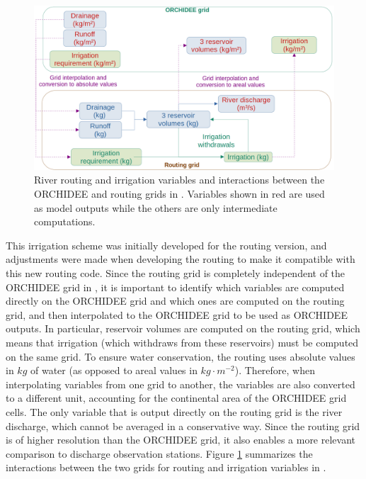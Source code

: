 \begin{figure}[htbp]
    \centering
    \includegraphics[width=\textwidth]{images/methods/routing_irrig_interpolation_outputvars.png}
    \caption{River routing and irrigation variables and interactions between the ORCHIDEE and routing grids in \native. Variables shown in red are used as model outputs while the others are only intermediate computations.}
    \label{fig:irrig_interpolations_outputvars}
\end{figure}

This irrigation scheme was initially developed for the \std routing version, and adjustments were made when developing the \native routing to make it compatible with this new routing code. Since the routing grid is completely independent of the ORCHIDEE grid in \native, it is important to identify which variables are computed directly on the ORCHIDEE grid and which ones are computed on the routing grid, and then interpolated to the ORCHIDEE grid to be used as ORCHIDEE outputs.
In particular, reservoir volumes are computed on the routing grid, which means that irrigation (which withdraws from these reservoirs) must be computed on the same grid.
To ensure water conservation, the \native routing uses absolute values in $kg$ of water (as opposed to areal values in $kg \cdot m^{-2}$). Therefore, when interpolating variables from one grid to another, the variables are also converted to a different unit, accounting for the continental area of the ORCHIDEE grid cells.
The only variable that is output directly on the routing grid is the river discharge, which cannot be averaged in a conservative way. Since the routing grid is of higher resolution than the ORCHIDEE grid, it also enables a more relevant comparison to discharge observation stations.
Figure \ref{fig:irrig_interpolations_outputvars} summarizes the interactions between the two grids for routing and irrigation variables in \native.


